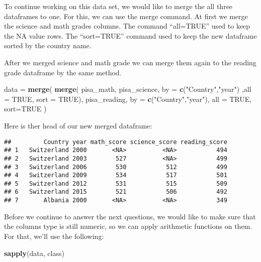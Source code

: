 \documentclass[]{article}
\newenvironment{Shaded}{\begin{snugshade}}{\end{snugshade}}
\newcommand{\KeywordTok}[1]{\textcolor[rgb]{0.13,0.29,0.53}{\textbf{#1}}}
\newcommand{\DataTypeTok}[1]{\textcolor[rgb]{0.13,0.29,0.53}{#1}}
\newcommand{\StringTok}[1]{\textcolor[rgb]{0.31,0.60,0.02}{#1}}
\newcommand{\OtherTok}[1]{\textcolor[rgb]{0.56,0.35,0.01}{#1}}
\newcommand{\NormalTok}[1]{#1}
\begin{document}
To continue working on this data set, we would like to merge the all
three dataframes to one. For this, we can use the merge command. At
first we merge the science and math grades columns. The command
``all=TRUE'' used to keep the NA value rows. The ``sort=TRUE'' command
used to keep the new dataframe sorted by the country name.

After we merged science and math grade we can merge them again to the
reading grade dataframe by the same method.

\begin{Shaded}
\begin{Highlighting}[]
\NormalTok{data =}\StringTok{ }\KeywordTok{merge}\NormalTok{( }\KeywordTok{merge}\NormalTok{( pisa_math, pisa_science, }\DataTypeTok{by =} \KeywordTok{c}\NormalTok{(}\StringTok{"Country"}\NormalTok{,}\StringTok{"year"}\NormalTok{) ,}\DataTypeTok{all =} \OtherTok{TRUE}\NormalTok{, }\DataTypeTok{sort =} \OtherTok{TRUE}\NormalTok{), pisa_reading, }\DataTypeTok{by =} \KeywordTok{c}\NormalTok{(}\StringTok{"Country"}\NormalTok{,}\StringTok{"year"}\NormalTok{), }\DataTypeTok{all =} \OtherTok{TRUE}\NormalTok{, }\DataTypeTok{sort=}\OtherTok{TRUE}\NormalTok{ )}
\end{Highlighting}
\end{Shaded}

Here is ther head of our new merged dataframe:

\begin{verbatim}
##         Country year math_score science_score reading_score
## 1   Switzerland 2000       <NA>          <NA>           494
## 2   Switzerland 2003        527          <NA>           499
## 3   Switzerland 2006        530           512           499
## 4   Switzerland 2009        534           517           501
## 5   Switzerland 2012        531           515           509
## 6   Switzerland 2015        521           506           492
## 7       Albania 2000       <NA>          <NA>           349
\end{verbatim}

Before we continue to answer the next questions, we would like to make
sure that the columns type is still numeric, so we can apply arithmetic
functions on them. For that, we'll use the following:

\begin{Shaded}
\begin{Highlighting}[]
\KeywordTok{sapply}\NormalTok{(data, class)}
\end{Highlighting}
\end{Shaded}
\end{document}
